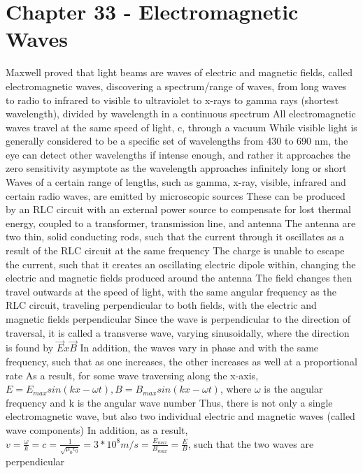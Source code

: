 \documentclass[11 pt, twoside]{article}
\newenvironment{outline*}
{
	\begin{outline}[enumerate]
	}
	{\end{outline}
}
\begin{document}
\section{Chapter 33 - Electromagnetic Waves}
\begin{outline*}
\1 Maxwell proved that light beams are waves of electric and magnetic fields, called electromagnetic waves, discovering a spectrum/range of waves, from long waves to radio to infrared to visible to ultraviolet to x-rays to gamma rays (shortest wavelength), divided by wavelength in a continuous spectrum
\2 All electromagnetic waves travel at the same speed of light, c, through a vacuum
\2 While visible light is generally considered to be a specific set of wavelengths from 430 to 690 nm, the eye can detect other wavelengths if intense enough, and rather it approaches the zero sensitivity asymptote as the wavelength approaches infinitely long or short
\1 Waves of a certain range of lengths, such as gamma, x-ray, visible, infrared and certain radio waves, are emitted by microscopic sources
\2 These can be produced by an RLC circuit with an external power source to compensate for lost thermal energy, coupled to a transformer, transmission line, and antenna
\3 The antenna are two thin, solid conducting rods, such that the current through it oscillates as a result of the RLC circuit at the same frequency
\3 The charge is unable to escape the current, such that it creates an oscillating electric dipole within, changing the electric and magnetic fields produced around the antenna
\2 The field changes then travel outwards at the speed of light, with the same angular frequency as the RLC circuit, traveling perpendicular to both fields, with the electric and magnetic fields perpendicular
\3 Since the wave is perpendicular to the direction of traversal, it is called a transverse wave, varying sinusoidally, where the direction is found by $\vec{E} x \vec{B}$
\3 In addition, the waves vary in phase and with the same frequency, such that as one increases, the other increases as well at a proportional rate
\1 As a result, for some wave traversing along the x-axis, $E = E_{max}sin(kx - \omega t), B = B_{max}sin(kx - \omega t)$, where $\omega$ is the angular frequency and k is the angular wave number
\2 Thus, there is not only a single electromagnetic wave, but also two individual electric and magnetic waves (called wave components)
\2 In addition, as a result, $v = \frac{\omega}{k} = c = \frac{1}{\sqrt{\mu_0\epsilon_0}} = 3 * 10^8 m/s = \frac{E_{max}}{B_{max}} = \frac{E}{B}$, such that the two waves are perpendicular

\end{outline*}
\end{document}
